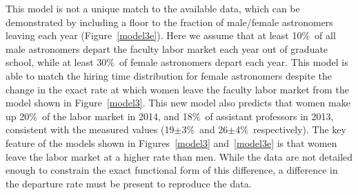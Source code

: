 \documentclass[modern]{aastex62}
\begin{document}
This model is not a unique match to the available data, which can be demonstrated by including a floor to the fraction of male/female astronomers leaving each year (Figure~\ref{model3e}). Here we assume that at least 10\%\ of all male astronomers depart the faculty labor market each year out of graduate school, while at least 30\%\ of female astronomers depart each year.  This model is able to match the hiring time distribution for female astronomers despite the change in the exact rate at which women leave the faculty labor market from the model shown in Figure~\ref{model3}. This new model also predicts that women make up 20\%\ of the labor market in 2014, and 18\%\ of assistant professors in 2013, consistent with the measured values (19$\pm$3\%\ and 26$\pm$4\%\ respectively). The key feature of the models shown in Figures~\ref{model3} and~\ref{model3e} is that women leave the labor market at a higher rate than men. While the data are not detailed enough to constrain the exact functional form of this difference, a difference in the departure rate must be present to reproduce the data.  
\end{document}

